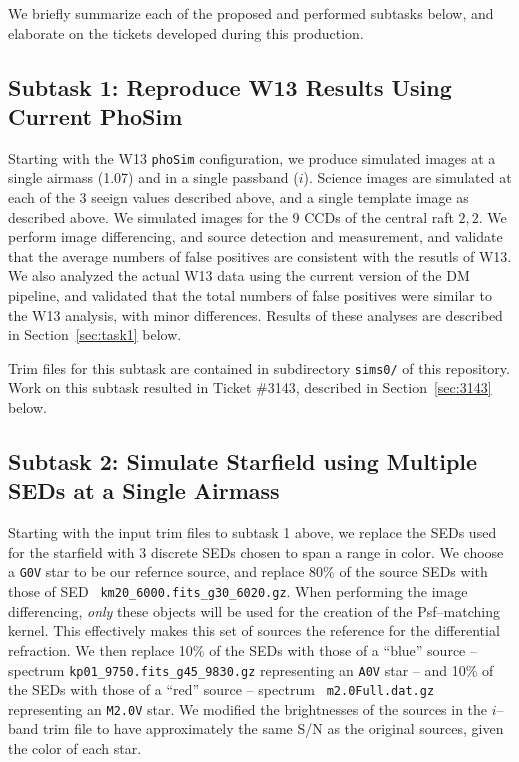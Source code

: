 \documentclass[prd, nofootinbib, floatfix, 11pt, tightenlines, times]{article}
\begin{document}
We briefly summarize each of the proposed and performed subtasks
below, and elaborate on the tickets developed during this production.

\subsection{Subtask 1: Reproduce W13 Results Using Current PhoSim}

Starting with the W13 {\tt phoSim} configuration, we produce simulated
images at a single airmass (1.07) and in a single passband ($i$).
Science images are simulated at each of the 3 seeign values described
above, and a single template image as described above.  We simulated
images for the 9 CCDs of the central raft $2,2$.  We perform image
differencing, and source detection and measurement, and validate that
the average numbers of false positives are consistent with the resutls
of W13.  We also analyzed the actual W13 data using the current
version of the DM pipeline, and validated that the total numbers of
false positives were similar to the W13 analysis, with minor
differences.  Results of these analyses are described in
Section~\ref{sec:task1} below.

Trim files for this subtask are contained in subdirectory {\tt sims0/}
of this repository.  Work on this subtask resulted in Ticket \#3143,
described in Section~\ref{sec:3143} below.

\subsection{Subtask 2: Simulate Starfield using Multiple SEDs at a Single Airmass}

Starting with the input trim files to subtask 1 above, we replace the
SEDs used for the starfield with 3 discrete SEDs chosen to span a
range in color.  We choose a {\tt G0V} star to be our refernce source,
and replace 80\% of the source SEDs with those of SED {\tt
  km20\_6000.fits\_g30\_6020.gz}.  When performing the image
differencing, {\it only} these objects will be used for the creation
of the Psf--matching kernel.  This effectively makes this set of
sources the reference for the differential refraction.  We then
replace 10\% of the SEDs with those of a ``blue'' source -- spectrum
{\tt kp01\_9750.fits\_g45\_9830.gz} representing an {\tt A0V} star --
and 10\% of the SEDs with those of a ``red'' source -- spectrum {\tt
  m2.0Full.dat.gz} representing an {\tt M2.0V} star.  We modified the
brightnesses of the sources in the $i$--band trim file to have
approximately the same S/N as the original sources, given the color of
each star.
\end{document}

